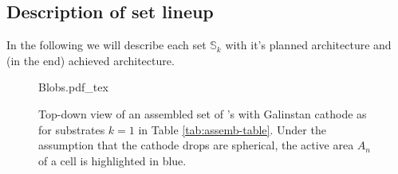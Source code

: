 \subsection{Description of set lineup}
In the following we will describe each set $\mathbb{S}_k$ with it's planned architecture and (in the end) achieved architecture.

\begin{figure}[h]\centering
{Blobs.pdf_tex}
\caption{Top-down view of an assembled set of \BHSC's with Galinstan cathode as for substrates $k=1$ in Table \ref{tab:assemb-table}. Under the assumption that the cathode drops are spherical, the active area $A_n$ of a cell is highlighted in blue.}
\label{fig:blobs}
\end{figure}


